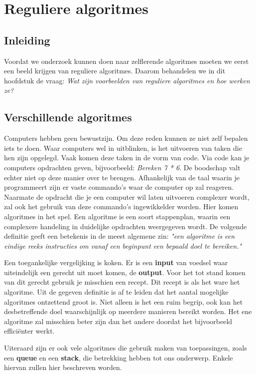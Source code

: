 
\section{Reguliere algoritmes}

\subsection{Inleiding}
Voordat we onderzoek kunnen doen naar zelflerende algoritmes moeten we eerst een beeld krijgen van reguliere algoritmes. Daarom behandelen we in dit hoofdstuk de vraag: \textit{Wat zijn voorbeelden van reguliere algoritmes en hoe werken ze?}


\subsection{Verschillende algoritmes}
Computers hebben geen bewustzijn. Om deze reden kunnen ze niet zelf bepalen iets te doen. Waar computers wel in uitblinken, is het uitvoeren van taken die hen zijn opgelegd. Vaak komen deze taken in de vorm van code. Via code kan je computers opdrachten geven, bijvoorbeeld: \textit{Bereken 7 * 6}. De boodschap valt echter niet op deze manier over te brengen. Afhankelijk van de taal waarin je programmeert zijn er vaste commando's waar de computer op zal reageren.
Naarmate de opdracht die je een computer wil laten uitvoeren complexer wordt, zal ook het gebruik van deze commando's ingewikkelder worden. Hier komen algoritmes in het spel. Een algoritme is een soort stappenplan, waarin een complexere handeling in duidelijke opdrachten weergegeven wordt. De volgende definitie geeft een betekenis in de meest algemene zin: \textit{"een algoritme is een eindige reeks instructies om vanaf een beginpunt een bepaald doel te bereiken."} \cite{WoordenOrg}

Een toegankelijke vergelijking is koken. Er is een \textbf{input} van voedsel waar uiteindelijk een gerecht uit moet komen, de \textbf{output}. Voor het tot stand komen van dit gerecht gebruik je misschien een recept. Dit recept is als het ware het algoritme.
Uit de gegeven definitie is af te leiden dat het aantal mogelijke algoritmes ontzettend groot is. Niet alleen is het een ruim begrip, ook kan het desbetreffende doel waarschijnlijk op meerdere manieren bereikt worden. Het ene algoritme zal misschien beter zijn dan het andere doordat het bijvoorbeeld effici\"enter werkt.

Uiteraard zijn er ook vele algoritmes die gebruik maken van toepassingen, zoals een \textbf{queue} en een \textbf{stack}, die betrekking hebben tot ons onderwerp. Enkele hiervan zullen hier beschreven worden.

